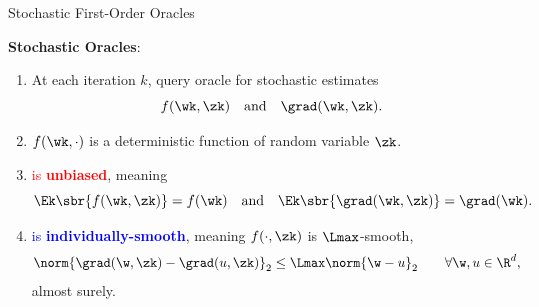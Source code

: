 \documentclass[mathserif,notheorems, hyperref={colorlinks, citecolor=blue, urlcolor=blue, linkcolor=blue}]{beamer}
\begin{document}
\begin{frame}{Stochastic First-Order Oracles}

	\textbf{Stochastic Oracles}:
	\begin{enumerate}
		\item At each iteration \( k \), query oracle \oracle{} for stochastic estimates
		      \[ f(\wk, \zk) \quad \text{and} \quad \grad(\wk, \zk). \]
		      \pause
		\item \( f(\wk, \cdot) \) is a deterministic function of random variable \( \zk \).
		      \pause
		      \vspace{1ex}
		\item \textcolor{red}{\oracle{} is \textbf{unbiased}}, meaning
		      \[ \Ek\sbr{f(\wk, \zk)} = f(\wk) \quad \text{and} \quad \Ek\sbr{\grad(\wk, \zk)} = \grad(\wk). \]%
		      \pause%
		      \vspace{-2ex}
		\item \textcolor{blue}{\oracle{} is \textbf{individually-smooth}}, meaning \( f(\cdot, \zk) \) is \( \Lmax \)-smooth,
		      \begin{align*}
			      \norm{\grad(\w, \zk) - \grad(u, \zk)}_2 & \leq \Lmax \norm{\w - u}_2 \tag*{\(\forall \w, u \in \R^d \),}
		      \end{align*}
		      almost surely.
	\end{enumerate}

\end{frame}
\end{document}
